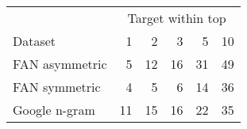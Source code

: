 \begin{tabular}{lrrrrr}\toprule
& \multicolumn{5}{c}{Target within top} \\
\cmidrule{2-6}
Dataset & 1 & 2 & 3 & 5 & 10 \\
\hline
FAN asymmetric & 5 & 12 & 16 & 31 & 49 \\
FAN symmetric & 4 & 5 & 6 & 14 & 36 \\
Google n-gram & 11 & 15 & 16 & 22 & 35 \\
\bottomrule
\end{tabular}

